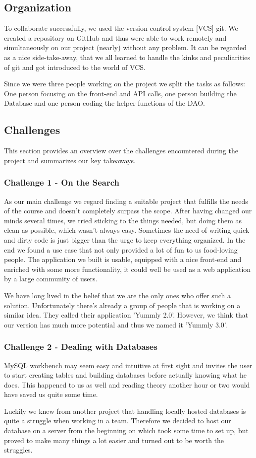 \documentclass[11pt,a4paper,notitlepage]{article}
\begin{document}
\subsection*{Organization}
To collaborate successfully, we used the version control system [VCS] git. We created a repository on GitHub and thus were able to work remotely and simultaneously on our project (nearly) without any problem. It can be regarded as a nice side-take-away, that we all learned to handle the kinks and peculiarities of git and got introduced to the world of VCS. \par Since we were three people working on the project we split the tasks as follows: One person focusing on the front-end and API calls, one person building the Database and one person coding the helper functions of the DAO.
\par
\subsection*{Challenges}
This section provides an overview over the challenges encountered during the project and summarizes our key takeaways.
\subsubsection*{Challenge 1 - On the Search}
As our main challenge we regard finding a suitable project that fulfills the needs of the course and doesn't completely surpass the scope. After having changed our minds several times, we tried sticking to the things needed, but doing them as clean as possible, which wasn't always easy. Sometimes the need of writing quick and dirty code is just bigger than the urge to keep everything organized. In the end we found a use case that not only provided a lot of fun to us food-loving people. The application we built is usable, equipped with a nice front-end and enriched with some more functionality, it could well be used as a web application by a large community of users. \par We have long lived in the belief that we are the only ones who offer such a solution. Unfortunately there's already a group of people that is working on a similar idea. They called their application 'Yummly 2.0'. However, we think that our version has much more potential and thus we named it 'Yummly 3.0'.
\subsubsection*{Challenge 2 - Dealing with Databases}
MySQL workbench may seem easy and intuitive at first sight and invites the user to start creating tables and building databases before actually knowing what he does. This happened to us as well and reading theory another hour or two would have saved us quite some time. \par Luckily we knew from another project that handling locally hosted databases is quite a struggle when working in a team. Therefore we decided to host our database on a server from the beginning on which took some time to set up, but proved to make many things a lot easier and turned out to be worth the struggles.\par
\end{document}
